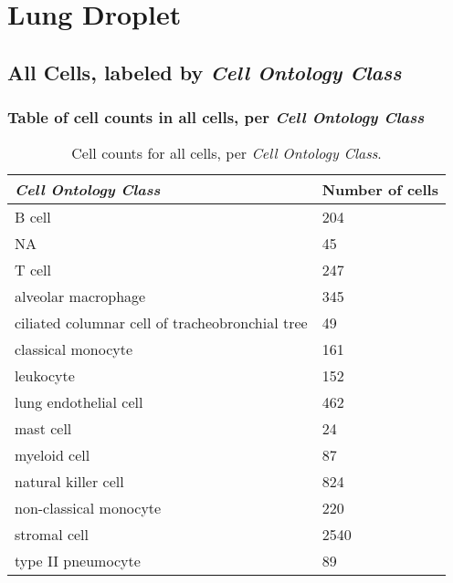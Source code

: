 \clearpage
\section{Lung Droplet}

\subsection{All Cells, labeled by \emph{Cell Ontology Class}}
\subsubsection{Table of cell counts in all cells, per \emph{Cell Ontology Class}}\begin{table}[h]
\centering
\label{my-label}
\begin{tabular}{@{}ll@{}}
\toprule

\emph{Cell Ontology Class}& Number of cells \\ \midrule
B cell & 204 \\

NA & 45 \\

T cell & 247 \\

alveolar macrophage & 345 \\

ciliated columnar cell of tracheobronchial tree & 49 \\

classical monocyte & 161 \\

leukocyte & 152 \\

lung endothelial cell & 462 \\

mast cell & 24 \\

myeloid cell & 87 \\

natural killer cell & 824 \\

non-classical monocyte & 220 \\

stromal cell & 2540 \\

type II pneumocyte & 89 \\
\bottomrule
\end{tabular}
\caption{Cell counts for all cells, per \emph{Cell Ontology Class}.}
\end{table}

